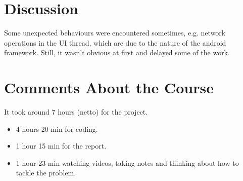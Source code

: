 \documentclass[a4paper]{scrartcl}
\begin{document}
\section{Discussion}
Some unexpected behaviours were encountered sometimes, e.g. network operations in the UI thread, which are due to the nature of the android framework. 
Still, it wasn't obvious at first and delayed some of the work.

\section{Comments About the Course}

It took around 7 hours (netto) for the project. 
\begin{itemize}
        \item 4 hours 20 min for coding.
        \item 1 hour 15 min for the report.
        \item 1 hour 23 min watching videos, taking notes and thinking about how to tackle the problem.
\end{itemize}
\end{document}
